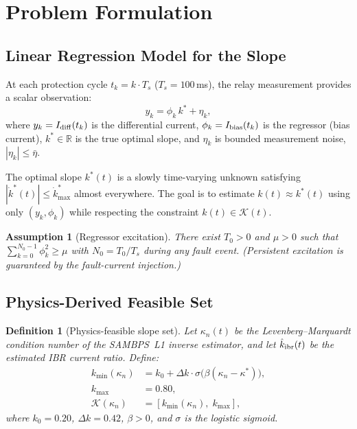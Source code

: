 \documentclass[journal]{IEEEtran}
\newtheorem{assumption}{Assumption}
\newtheorem{definition}{Definition}
\newcommand{\kappan}{\kappa_{n}}
\newcommand{\kstar}{k^*}
\newcommand{\kmin}{k_{\min}}
\newcommand{\kmax}{k_{\max}}
\newcommand{\Idiff}{I_{\rm diff}}
\newcommand{\Ibias}{I_{\rm bias}}
\newcommand{\calK}{\mathcal{K}}
\begin{document}
\section{Problem Formulation}
\label{sec:problem}

\subsection{Linear Regression Model for the Slope}

At each protection cycle $t_k = k \cdot T_s$ ($T_s = 100$\,ms),
the relay measurement provides a scalar observation:
\begin{equation}
  y_k = \phi_k\,k^* + \eta_k,
  \label{eq:regressor}
\end{equation}
where $y_k = \Idiff(t_k)$ is the differential current,
$\phi_k = \Ibias(t_k)$ is the regressor (bias current),
$k^* \in \mathbb{R}$ is the true optimal slope, and
$\eta_k$ is bounded measurement noise, $|\eta_k| \leq \bar{\eta}$.

The optimal slope $\kstar(t)$ is a slowly time-varying unknown
satisfying $|\dot{k}^*(t)| \leq \dot{k}^*_{\max}$ almost everywhere.
The goal is to estimate $k(t) \approx \kstar(t)$ using only
$(y_k, \phi_k)$ while respecting the constraint $k(t) \in \calK(t)$.

\begin{assumption}[Regressor excitation]
\label{asm:excit}
There exist $T_0 > 0$ and $\mu > 0$ such that
$\sum_{k=0}^{N_0-1} \phi_k^2 \geq \mu$ with $N_0 = T_0/T_s$
during any fault event.  (Persistent excitation is guaranteed
by the fault-current injection.)
\end{assumption}

\subsection{Physics-Derived Feasible Set}

\begin{definition}[Physics-feasible slope set]
\label{def:feasible}
Let $\kappan(t)$ be the Levenberg--Marquardt condition number
of the SAMBPS~L1 inverse estimator, and let
$\hat{k}_{\rm ibr}(t)$ be the estimated IBR current ratio.
Define:
\begin{align}
  \kmin(\kappan) &= k_0 + \Delta k \cdot
    \sigma\!\bigl(\beta(\kappan - \kappa^*)\bigr),
    \label{eq:kmin}\\
  \kmax &= 0.80,
  \label{eq:kmax}\\
  \calK(\kappan) &= [\kmin(\kappan),\;\kmax],
  \label{eq:calK}
\end{align}
where $k_0 = 0.20$, $\Delta k = 0.42$, $\beta > 0$, and
$\sigma$ is the logistic sigmoid.
\end{definition}
\end{document}
